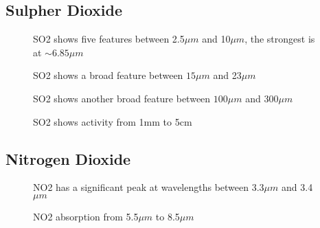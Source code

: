 \documentclass[12pt]{article}
\begin{document}
\subsection{Sulpher Dioxide}


\vspace*{11.5cm}
\begin{figure}[htb]
\caption{SO2 shows five features between 2.5$\mu m$ and 10$\mu m$, the strongest
 is at $\sim 6.85\mu m$}
\end{figure}
\newpage


\vspace*{11.5cm}
\begin{figure}[htb]
\caption{SO2 shows a broad feature between $15\mu m$ and 23$\mu m$}
\end{figure}
\newpage


\vspace*{11.5cm}
\begin{figure}[htb]
\caption{SO2 shows another broad feature between $100\mu m$ and 300$\mu m$}
\end{figure}
\newpage

\vspace*{11.5cm}
\begin{figure}[htb]
\caption{SO2 shows activity from 1mm to 5cm}
\end{figure}
\newpage

\subsection{Nitrogen Dioxide}


\vspace*{11.5cm}
\begin{figure}[htb]
\caption{NO2 has a significant peak at wavelengths between 3.3$\mu m$ and 3.4$\mu m$}
\end{figure}
\newpage


\vspace*{11.5cm}
\begin{figure}[htb]
\caption{NO2 absorption from  5.5$\mu m$ to 8.5$\mu m$}
\end{figure}
\newpage
\end{document}
